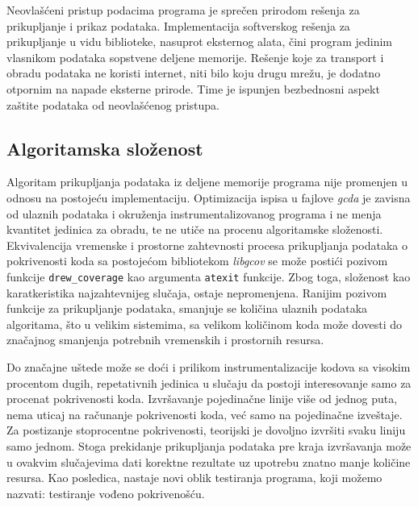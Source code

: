 \documentclass[12pt,oneside]{memoir}
\newcommand{\kod}[1]{\texttt{#1}}
\newcommand{\strano}[1]{\textit{#1}}
\begin{document}
Neovlašćeni pristup podacima programa je sprečen prirodom rešenja za prikupljanje i prikaz podataka. Implementacija softverskog rešenja za prikupljanje u vidu biblioteke, nasuprot eksternog alata, čini program jedinim vlasnikom podataka sopstvene deljene memorije. Rešenje koje za transport i obradu podataka ne koristi internet, niti bilo koju drugu mrežu, je dodatno otpornim na napade eksterne prirode. Time je ispunjen bezbednosni aspekt zaštite podataka od neovlašćenog pristupa. 

\subsection{Algoritamska složenost}

Algoritam prikupljanja podataka iz deljene memorije programa nije promenjen u odnosu na postojeću implementaciju. Optimizacija ispisa u fajlove \strano{gcda} je zavisna od ulaznih podataka i okruženja instrumentalizovanog programa i ne menja kvantitet jedinica za obradu, te ne utiče na procenu algoritamske složenosti. Ekvivalencija vremenske i prostorne zahtevnosti procesa prikupljanja podataka o pokrivenosti koda sa postojećom bibliotekom \strano{libgcov} se može postići pozivom funkcije \kod{drew\_coverage} kao argumenta \kod{atexit} funkcije. Zbog toga, složenost kao karatkeristika najzahtevnijeg slučaja, ostaje nepromenjena. Ranijim pozivom funkcije za prikupljanje podataka, smanjuje se količina ulaznih podataka algoritama, što u velikim sistemima, sa velikom količinom koda može dovesti do značajnog smanjenja potrebnih vremenskih i prostornih resursa. 

Do značajne uštede može se doći i prilikom instrumentalizacije kodova sa visokim procentom dugih, repetativnih jedinica u slučaju da postoji interesovanje samo za procenat pokrivenosti koda. Izvršavanje pojedinačne linije više od jednog puta, nema uticaj na računanje pokrivenosti koda, već samo na pojedinačne izveštaje. Za postizanje stoprocentne pokrivenosti, teorijski je dovoljno izvršiti svaku liniju samo jednom. Stoga prekidanje prikupljanja podataka pre kraja izvršavanja može u ovakvim slučajevima dati korektne rezultate uz upotrebu znatno manje količine resursa. Kao posledica, nastaje novi oblik testiranja programa, koji možemo nazvati: testiranje vođeno pokrivenošću. 
\end{document}
